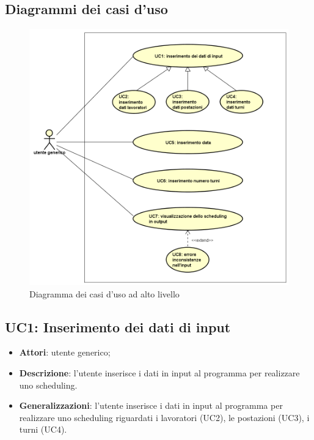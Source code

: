 \subsection{Diagrammi dei casi d'uso}
\begin{figure}[!h]
    \begin{widepage}
        \includegraphics[width=\textwidth,keepaspectratio]{../immagini/usecase/System.png}
        \caption{Diagramma dei casi d'uso ad alto livello}
    \end{widepage}
\end{figure}
\clearpage
\subsection{UC1: Inserimento dei dati di input}
\label{UC1}
\begin{itemize}
    \item \textbf{Attori}: utente generico;
    \item \textbf{Descrizione}: l'utente inserisce i dati in input al programma per realizzare uno scheduling.
    \item \textbf{Generalizzazioni}: l'utente inserisce i dati in input al programma per realizzare uno scheduling riguardati i lavoratori (UC2), le postazioni (UC3), i turni (UC4).
\end{itemize}

